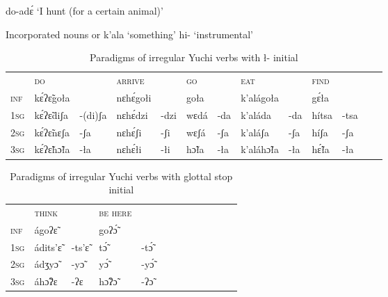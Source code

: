 \documentclass[oneside,a4paper,11pt]{article}
\newcommand{\ipa}[1]{{\phon#1}} %
\begin{document}
\ipa{do-adɛ́} `I hunt (for a certain animal)'


\citet[332]{wagner38yuchi}

\citet[334]{wagner38yuchi}

Incorporated nouns or \ipa{k'ala} `something' \ipa{hi-} `instrumental'

\begin{table}[H]
\caption{Paradigms of irregular Yuchi verbs with \ipa{ł-} initial} \label{tab:yuchi.l} \centering
\begin{tabular}{lllllllllllll}
\toprule
\textsc{} &	\textsc{do} &	\textsc{} &	\textsc{arrive} &	\textsc{} &	\textsc{go} &	\textsc{} &	\textsc{eat} &	\textsc{} &	\textsc{find} &	\textsc{} &	\\
\textsc{inf} &	\ipa{kɛ́ʔɛ̃goła} &	\ipa{} &	\ipa{nɛhɛ́gołi} &	\ipa{} &	\ipa{goła} &	\ipa{} &	\ipa{k'alágoła} &	\ipa{} &	\ipa{gɛ́ła} &	\ipa{} &	\\
\textsc{1sg} &	\ipa{kɛ́ʔɛ̃diʃa} &	\ipa{-(di)ʃa} &	\ipa{nɛhɛ́dzi} &	\ipa{-dzi} &	\ipa{wɛdá} &	\ipa{-da} &	\ipa{k'aláda} &	\ipa{-da} &	\ipa{hítsa} &	\ipa{-tsa} &	\\
\textsc{2sg} &	\ipa{kɛ́ʔɛ̃nɛʃa} &	\ipa{-ʃa} &	\ipa{nɛhɛ́ʃi} &	\ipa{-ʃi} &	\ipa{wɛʃá} &	\ipa{-ʃa} &	\ipa{k'aláʃa} &	\ipa{-ʃa} &	\ipa{híʃa} &	\ipa{-ʃa} &	\\
\textsc{3sg} &	\ipa{kɛ́ʔɛ̃hɔ̃ła} &	\ipa{-ła} &	\ipa{nɛhɛ́łi} &	\ipa{-łi} &	\ipa{hɔ̃ła} &	\ipa{-ła} &	\ipa{k'aláhɔ̃ła} &	\ipa{-ła} &	\ipa{hɛ̃́ła} &	\ipa{-ła} &	\\
\bottomrule
\end{tabular}
\end{table}



\begin{table}[H]
\caption{Paradigms of irregular Yuchi verbs with glottal stop initial} \label{tab:yuchi.glottal} \centering
\begin{tabular}{lllllllllllll}
\toprule
\textsc{} &	\textsc{think} &	\textsc{} &	\textsc{be here} &	\textsc{} &	\\	
\textsc{inf} &	\ipa{ágoʔɛ̃} &	\ipa{} &	\ipa{goʔɔ̃́} &	\ipa{} &	\\	
\textsc{1sg} &	\ipa{ádits'ɛ̃} &	\ipa{-ts'ɛ̃} &	\ipa{tɔ̃́} &	\ipa{-tɔ̃́} &	\\	
\textsc{2sg} &	\ipa{ádʒyɔ̃} &	\ipa{-yɔ̃} &	\ipa{yɔ̃́} &	\ipa{-yɔ̃́} &	\\	
\textsc{3sg} &	\ipa{áhɔ̃ʔɛ} &	\ipa{-ʔɛ} &	\ipa{hɔ̃ʔɔ̃} &	\ipa{-ʔɔ̃} &	\\	
\bottomrule
\end{tabular}
\end{table}
 
\end{document}
